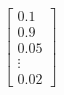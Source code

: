 \documentclass[preview]{standalone}
\begin{document}
\begin{align*}
\begin{bmatrix} 0.1 \\ 0.9 \\ 0.05 \\ \vdots \\ 0.02 \end{bmatrix}
\end{align*}
\end{document}
